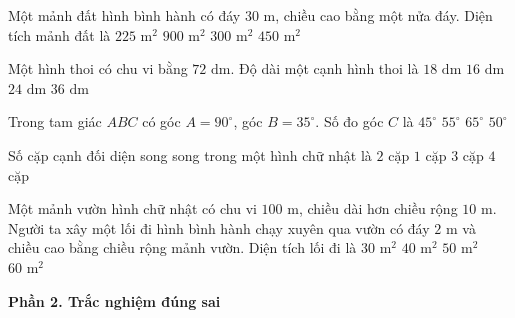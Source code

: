 \begin{ex} %
Một mảnh đất hình bình hành có đáy $30\text{ m}$, chiều cao bằng một nửa đáy. Diện tích mảnh đất là
\choice
{$225\text{ m}^2$}
{$900\text{ m}^2$}
{$300\text{ m}^2$}
{\True $450\text{ m}^2$}
\end{ex}

\begin{ex} %
Một hình thoi có chu vi bằng $72\text{ dm}$. Độ dài một cạnh hình thoi là
\choice
{\True $18\text{ dm}$}
{$16\text{ dm}$}
{$24\text{ dm}$}
{$36\text{ dm}$}
\end{ex}

\begin{ex} %
Trong tam giác $ABC$ có góc $A = 90^\circ$, góc $B = 35^\circ$. Số đo góc $C$ là
\choice
{$45^\circ$}
{\True $55^\circ$}
{$65^\circ$}
{$50^\circ$}
\end{ex}

\begin{ex} %
Số cặp cạnh đối diện song song trong một hình chữ nhật là
\choice
{\True $2$ cặp}
{$1$ cặp}
{$3$ cặp}
{$4$ cặp}
\end{ex}

\begin{ex} %
Một mảnh vườn hình chữ nhật có chu vi $100\text{ m}$, chiều dài hơn chiều rộng $10\text{ m}$. Người ta xây một lối đi hình bình hành chạy xuyên qua vườn có đáy $2\text{ m}$ và chiều cao bằng chiều rộng mảnh vườn. Diện tích lối đi là
\choice
{$30\text{ m}^2$}
{\True $40\text{ m}^2$}
{$50\text{ m}^2$}
{$60\text{ m}^2$}
\end{ex}

\textbf{Phần 2. Trắc nghiệm đúng sai}

